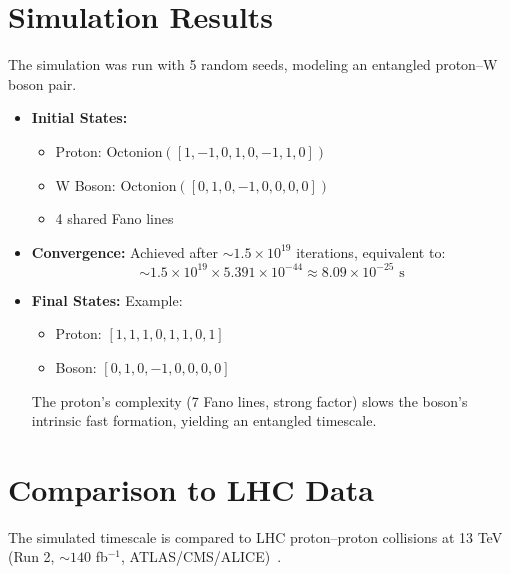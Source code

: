 \documentclass[pdflatex,sn-mathphys-num]{sn-jnl}
\theoremstyle{thmstyleone}
\theoremstyle{thmstyletwo}
\theoremstyle{thmstylethree}
\begin{document}
\section{Simulation Results}\label{sec:s2-results}
The simulation was run with 5 random seeds, modeling an entangled proton--W boson pair.
\begin{itemize}
    \item \textbf{Initial States:}
    \begin{itemize}
        \item Proton: Octonion$([1, -1, 0, 1, 0, -1, 1, 0])$
        \item W Boson: Octonion$([0, 1, 0, -1, 0, 0, 0, 0])$
        \item 4 shared Fano lines
    \end{itemize}
   
    \item \textbf{Convergence:} Achieved after $\sim 1.5 \times 10^{19}$ iterations, equivalent to:
    \begin{equation}
    \sim 1.5 \times 10^{19} \times 5.391 \times 10^{-44} \approx 8.09 \times 10^{-25} \text{ s}
    \end{equation}
   
    \item \textbf{Final States:} Example:
    \begin{itemize}
        \item Proton: $[1, 1, 1, 0, 1, 1, 0, 1]$
        \item Boson: $[0, 1, 0, -1, 0, 0, 0, 0]$
    \end{itemize}
   
    The proton's complexity (7 Fano lines, strong factor) slows the boson's intrinsic fast formation, yielding an entangled timescale.
\end{itemize}


\section{Comparison to LHC Data}\label{sec:s2-comparison}
The simulated timescale is compared to LHC proton--proton collisions at 13 TeV (Run 2, $\sim 140$ fb$^{-1}$, ATLAS/CMS/ALICE)~\cite{atlas2015top,cms2018w,alice2017femto}.
\end{document}
